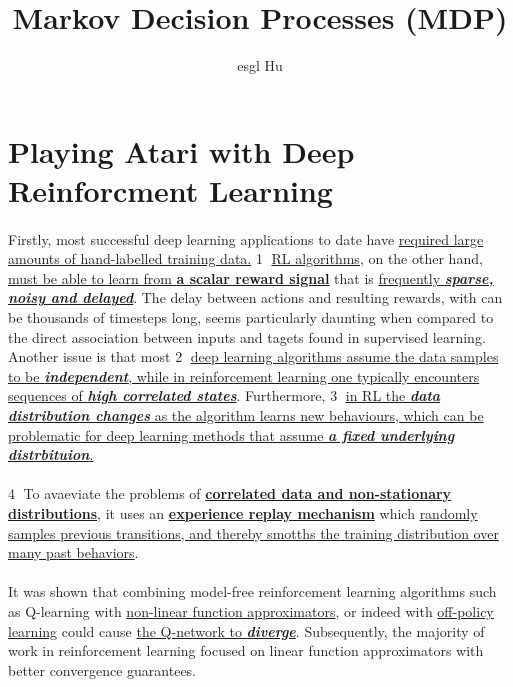 \documentclass[12pt,a4paper]{article}
\begin{document}
\title{Markov Decision Processes (MDP)}
\author{esgl Hu}
\maketitle

\section{Playing Atari with Deep Reinforcment Learning  \cite{Mnih2013Playing}}
\paragraph{} Firstly, most successful deep learning applications to date have \uline{required large amounts of hand-labelled training data.} \textcircled{1} \uline{RL algorithms}, on the other hand, \uline{must be able to learn from \textbf{a scalar reward signal}} that is \uline{frequently\textbf{ \textit{sparse, noisy and delayed}}}. The delay between actions and resulting rewards, with can be thousands of timesteps long, seems particularly daunting when compared to the direct association between inputs and tagets found in supervised learning. Another issue is that most \textcircled{2} \uline{deep learning algorithms assume the data samples to be \textbf{\textit{independent}}, while in reinforcement learning one typically encounters sequences of \textbf{\textit{high correlated states}}}. Furthermore, \textcircled{3} \uline{in RL the \textbf{\textit{data distribution changes}} as the algorithm learns new behaviours, which can be problematic for deep learning methods that assume\textbf{\textit{ a fixed underlying distrbituion}}.}

\paragraph{}\textcircled{4} To avaeviate the problems of \uline{\textbf{correlated data and non-stationary distributions}}, it uses an \uline{\textbf{experience replay mechanism}} which \uline{randomly samples previous transitions, and thereby smotths the training distribution over many past behaviors}.

\paragraph{}It was shown that combining model-free reinforcement learning algorithms such as Q-learning with \uline{non-linear function approximators}, or indeed with \uline{off-policy learning} could cause \uline{the Q-network to \textbf{\textit{diverge}}}. Subsequently, the majority of work in reinforcement learning focused on linear function approximators with better convergence guarantees. \cite{Tsitsiklis2002An}
\end{document}
